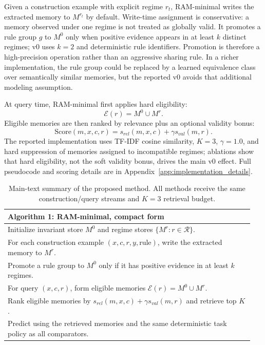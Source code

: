 \documentclass{article} %
\begin{document}
Given a construction example with explicit regime $r_t$, RAM-minimal writes the extracted memory to $M^{r_t}$ by default.
Write-time assignment is conservative: a memory observed under one regime is not treated as globally valid.
It promotes a rule group $g$ to $M^0$ only when positive evidence appears in at least $k$ distinct regimes; v0 uses $k=2$ and deterministic rule identifiers.
Promotion is therefore a high-precision operation rather than an aggressive sharing rule.
In a richer implementation, the rule group could be replaced by a learned equivalence class over semantically similar memories, but the reported v0 avoids that additional modeling assumption.

At query time, RAM-minimal first applies hard eligibility:
\begin{equation}
    \mathcal{E}(r)=M^0 \cup M^r.
\end{equation}
Eligible memories are then ranked by relevance plus an optional validity bonus:
\begin{equation}
    \mathrm{Score}(m,x,c,r)=s_{rel}(m,x,c)+\gamma s_{val}(m,r).
\end{equation}
The reported implementation uses TF-IDF cosine similarity, $K=3$, $\gamma=1.0$, and hard suppression of memories assigned to incompatible regimes; ablations show that hard eligibility, not the soft validity bonus, drives the main v0 effect.
Full pseudocode and scoring details are in Appendix~\ref{app:implementation_details}.

\begin{table}[t]
\centering
\footnotesize
\begin{tabular}{p{0.95\linewidth}}
\toprule
\textbf{Algorithm 1: RAM-minimal, compact form} \\
\midrule
Initialize invariant store $M^0$ and regime stores $\{M^r:r\in\mathcal{R}\}$. \\
For each construction example $(x,c,r,y,\mathrm{rule})$, write the extracted memory to $M^r$. \\
Promote a rule group to $M^0$ only if it has positive evidence in at least $k$ regimes. \\
For query $(x,c,r)$, form eligible memories $\mathcal{E}(r)=M^0\cup M^r$. \\
Rank eligible memories by $s_{rel}(m,x,c)+\gamma s_{val}(m,r)$ and retrieve top $K$. \\
Predict using the retrieved memories and the same deterministic task policy as all comparators. \\
\bottomrule
\end{tabular}
\caption{Main-text summary of the proposed method. All methods receive the same construction/query streams and $K=3$ retrieval budget.}
\label{alg:ram_compact}
\end{table}
\end{document}
